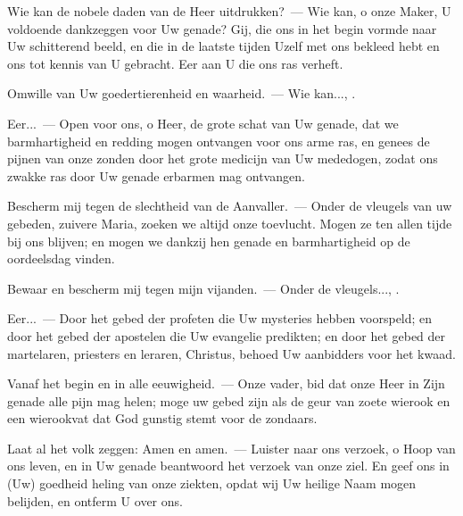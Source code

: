 \documentclass[12pt,twoside,a5paper]{article}
\begin{document}

\begin{halfparskip}
  Wie kan de nobele daden van de Heer uitdrukken?~--- Wie kan, o onze Maker, U voldoende dankzeggen voor Uw genade? Gij, die ons in het begin vormde naar Uw schitterend beeld, en die in de laatste tijden Uzelf met ons bekleed hebt en ons tot kennis van U gebracht. Eer aan U die ons ras verheft.

  Omwille van Uw goedertierenheid en waarheid.~--- Wie kan..., .

  Eer...~--- Open voor ons, o Heer, de grote schat van Uw genade, dat we barmhartigheid en redding mogen ontvangen voor ons arme ras, en genees de pijnen van onze zonden door het grote medicijn van Uw mededogen, zodat ons zwakke ras door Uw genade erbarmen mag ontvangen.
\end{halfparskip}


\begin{halfparskip}
  Bescherm mij tegen de slechtheid van de Aanvaller.~--- Onder de vleugels van uw gebeden, zuivere Maria, zoeken we altijd onze toevlucht. Mogen ze ten allen tijde bij ons blijven; en mogen we dankzij hen genade en barmhartigheid op de oordeelsdag vinden.

  Bewaar en bescherm mij tegen mijn vijanden.~--- Onder de vleugels..., .

  Eer...~--- Door het gebed der profeten die Uw mysteries hebben voorspeld; en door het gebed der apostelen die Uw evangelie predikten; en door het gebed der martelaren, priesters en leraren, Christus, behoed Uw aanbidders voor het kwaad.

  Vanaf het begin en in alle eeuwigheid.~--- Onze vader, bid dat onze Heer in Zijn genade alle pijn mag helen; moge uw gebed zijn als de geur van zoete wierook en een wierookvat dat God gunstig stemt voor de zondaars.

  Laat al het volk zeggen: Amen en amen.~--- Luister naar ons verzoek, o Hoop van ons leven, en in Uw genade beantwoord het verzoek van onze ziel. En geef ons in (Uw) goedheid heling van onze ziekten, opdat wij Uw heilige Naam mogen belijden, en ontferm U over ons.
\end{halfparskip}

\end{document}
